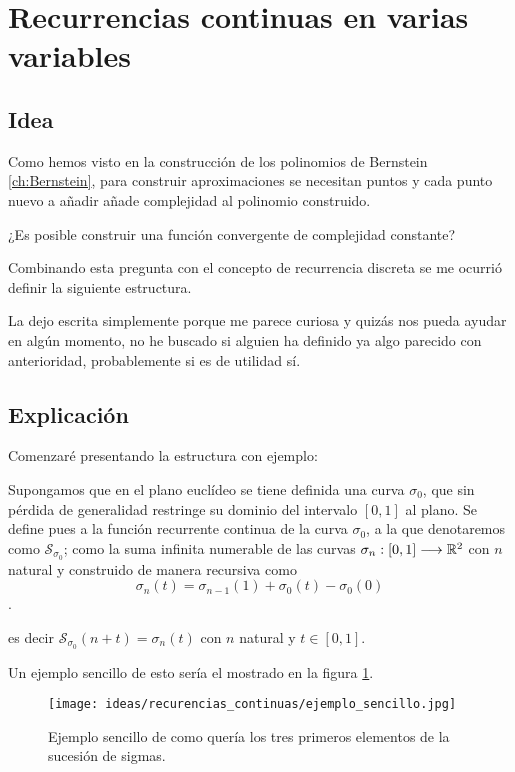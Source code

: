 %
\section{Recurrencias continuas en varias variables}\label{ch:ideas_recurrencias_continuas_en_varias_variables}

\subsection{Idea}

Como hemos visto en la construcción de los polinomios de 
Bernstein \ref{ch:Bernstein}, para construir aproximaciones se necesitan puntos 
y cada punto nuevo a añadir añade complejidad al polinomio construido.

¿Es posible construir una función convergente de complejidad constante?

Combinando esta pregunta con el concepto de recurrencia discreta se me ocurrió definir 
la siguiente estructura. 

La dejo escrita simplemente porque me parece curiosa y quizás nos pueda ayudar en algún momento, 
no he buscado si alguien ha definido ya algo parecido con anterioridad, probablemente si es de utilidad sí. 

\subsection{Explicación}  

Comenzaré presentando la estructura con ejemplo:  

Supongamos que en el plano euclídeo se tiene definida una curva $\sigma_0$, 
que sin pérdida de generalidad restringe su dominio del intervalo $[0,1]$ al plano. 
Se define pues a la función recurrente continua de la curva $\sigma_0$, 
a la que denotaremos como $\mathcal S_{\sigma_0}$;
como la suma infinita numerable de
 las curvas $\sigma_n :[0,1] \longrightarrow \mathbb{R}^2$ con $n$ natural y construido de manera recursiva como
 $$\sigma_n(t) = \sigma_{n-1}(1) + \sigma_0(t) - \sigma_0(0)$$.  

 es decir $\mathcal S_{\sigma_0}(n + t) = \sigma_n(t)$  con $n$ natural y $t \in [0,1]$.

 Un ejemplo sencillo de esto sería el mostrado en la figura \ref{img:idea_recurrencia_ejemplo_sencillo}.  
 \begin{figure}[h!]
 \texttt{[image: ideas/recurencias\_continuas/ejemplo\_sencillo.jpg]}
 \caption{Ejemplo sencillo de como quería los tres primeros elementos de la sucesión de sigmas.}
 \label{img:idea_recurrencia_ejemplo_sencillo}
\end{figure}

